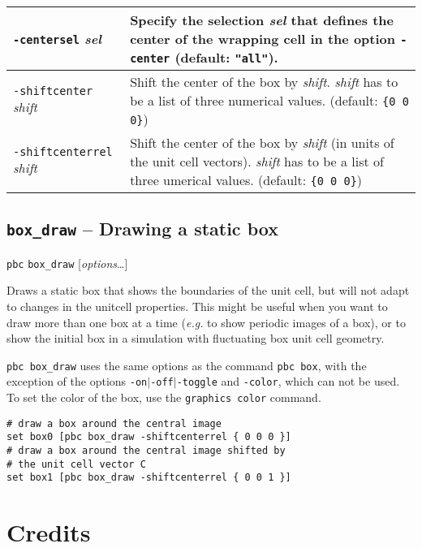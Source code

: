 \documentclass[a4paper, DIV12]{scrartcl}
\newcommand{\eg}{\emph{e.g.}\xspace}
\begin{document}
\begin{tabular}{|p{}|p{}|}
\texttt{-centersel} \textit{sel}
& Specify the selection \textit{sel} that defines the center of the
wrapping cell in the option \texttt{-center} (default:
\texttt{"all"}).
\\ \hline

\texttt{-shiftcenter} \textit{shift}
& Shift the center of the box by \textit{shift}. \textit{shift} has to
be a list of three numerical values. (default: \verb!{0 0 0}!)
\\ \hline

\texttt{-shiftcenterrel} \textit{shift}
& Shift the center of the box by \textit{shift} (in units of
the unit cell vectors). \textit{shift} has to be a list of
three umerical values. (default: \verb!{0 0 0}!)
\\ \hline
\end{tabular}

\newpage
\subsection{\texttt{box\_draw} -- Drawing a static box}
\label{sec:box_draw}


\texttt{pbc} \texttt{box\_draw} [\textit{options}\dots]


Draws a static box that shows the boundaries of the unit cell, but
will not adapt to changes in the unitcell properties. This might be
useful when you want to draw more than one box at a time (\eg to show
periodic images of a box), or to show the initial box in a simulation
with fluctuating box unit cell geometry.


\texttt{pbc box\_draw} uses the same options as the command
\texttt{pbc box}, with the exception of the options
\texttt{-on}$|$\texttt{-off}$|$\texttt{-toggle} and \texttt{-color},
which can not be used. To set the color of the box, use the
\texttt{graphics color} command.


\begin{Verbatim}
# draw a box around the central image 
set box0 [pbc box_draw -shiftcenterrel { 0 0 0 }] 
# draw a box around the central image shifted by 
# the unit cell vector C 
set box1 [pbc box_draw -shiftcenterrel { 0 0 1 }]
\end{Verbatim}

\section{Credits}
\end{document}
